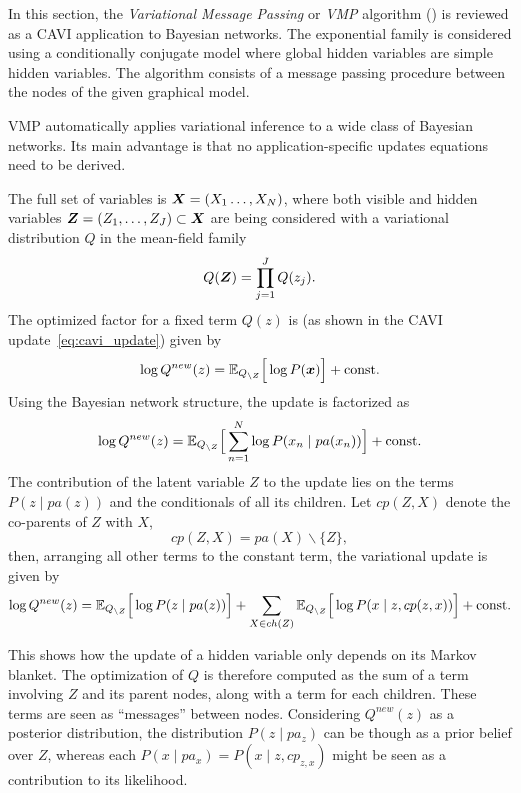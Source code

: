 
In this section, the \emph{Variational Message Passing} or \emph{VMP} algorithm (\cite{winn2005variational, bishop2003vibes}) is reviewed as a CAVI application to Bayesian networks. The exponential family is considered using a conditionally conjugate model where global hidden variables are simple hidden variables. The algorithm consists of a message passing procedure between the nodes of the given graphical model.

VMP automatically applies variational inference to a wide class of Bayesian networks. Its main advantage is that no application-specific updates equations need to be derived.

The full set of variables is \( \bm{X} = (X_1\dots,X_N) \), where both visible and hidden variables \( \bm{Z} = (Z_1,\dots,Z_J) \subset \bm{X}\) are being considered with a variational distribution \( Q \) in the mean-field family
\[
   Q(\bm{Z}) = \prod_{j=1}^J Q(z_j).
\]
The optimized factor for a fixed term \(Q(z)\) is (as shown in the CAVI update~\ref{eq:cavi_update}) given by
\begin{equation}\label{eq:vmp_update}
   \log Q^{new}(z) = \mathbb{E}_{Q_{\backslash Z}}\Big[\log P(\bm{x})\Big] + \text{const.}
\end{equation}
Using the Bayesian network structure, the update is factorized as
\[
  \log Q^{new}(z) = \mathbb{E}_{Q_{\backslash Z}}\Big[ \sum_{n=1}^N \log P(x_n \mid pa(x_n))\Big] + \text{const.}
\]
The contribution of the latent variable \(Z\) to the update lies on the terms \( P(z \mid pa(z)) \) and the conditionals of all its children. Let \(cp(Z,X)\) denote the co-parents of \(Z\) with \(X\),
\[
  cp(Z,X) = pa(X)\backslash \{Z\},
\]
then, arranging all other terms to the constant term, the variational update is given by
\begin{equation}\label{eq:vmp_update_open}
   \log Q^{new}(z) = \mathbb{E}_{Q_{\backslash Z}}\Big[\log P(z \mid pa(z))\Big] + \sum_{X \in ch(Z)} \mathbb{E}_{Q_{\backslash Z}}\Big[\log P(x \mid z,cp(z, x))\Big] + \text{const.}
\end{equation}

This shows how the update of a hidden variable only depends on its Markov blanket. The optimization of \( Q \) is therefore computed as the sum of a term involving \( Z \) and its parent nodes, along with a term for each children. These terms are seen as ``messages'' between nodes. Considering \(Q^{new}(z)\) as a posterior distribution, the distribution \( P(z \mid pa_z) \) can be though as a prior belief over \( Z \), whereas each \( P(x \mid pa_x) = P(x \mid z, cp_{z,x})\) might be seen as a contribution to its likelihood.

